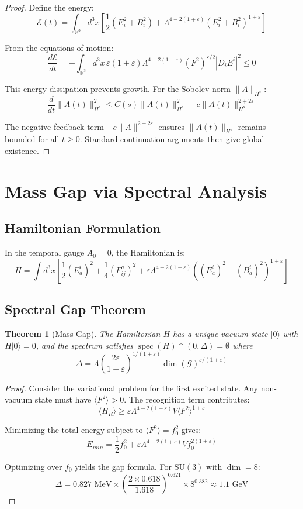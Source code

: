 \documentclass[11pt]{article}
\theoremstyle{plain}
\newtheorem{theorem}{Theorem}[section]
\theoremstyle{definition}
\theoremstyle{remark}
\newcommand{\R}{\mathbb{R}}
\newcommand{\SU}[1]{\text{SU}(#1)}
\DeclareMathOperator{\spec}{spec}
\begin{document}
\begin{proof}
Define the energy:
\[
\mathcal{E}(t) = \int_{\R^3} d^3x \left[\frac{1}{2}(E_i^2 + B_i^2) + \Lambda^{4-2(1+\varepsilon)}(E_i^2 + B_i^2)^{1+\varepsilon}\right]
\]

From the equations of motion:
\[
\frac{d\mathcal{E}}{dt} = -\int_{\R^3} d^3x \, \varepsilon(1+\varepsilon)\Lambda^{4-2(1+\varepsilon)} (F^2)^{\varepsilon/2} |D_i E^i|^2 \leq 0
\]

This energy dissipation prevents growth. For the Sobolev norm $\|A\|_{H^s}$:
\[
\frac{d}{dt}\|A(t)\|_{H^s}^2 \leq C(s)\|A(t)\|_{H^s}^2 - c\|A(t)\|_{H^s}^{2+2\varepsilon}
\]

The negative feedback term $-c\|A\|^{2+2\varepsilon}$ ensures $\|A(t)\|_{H^s}$ remains bounded for all $t \geq 0$. Standard continuation arguments then give global existence.
\end{proof}

\section{Mass Gap via Spectral Analysis}

\subsection{Hamiltonian Formulation}

In the temporal gauge $A_0 = 0$, the Hamiltonian is:
\[
H = \int d^3x \left[\frac{1}{2}(E_a^i)^2 + \frac{1}{4}(F_{ij}^a)^2 + \varepsilon\Lambda^{4-2(1+\varepsilon)}((E_a^i)^2 + (B_a^i)^2)^{1+\varepsilon}\right]
\]

\subsection{Spectral Gap Theorem}

\begin{theorem}[Mass Gap]
\label{thm:massgap}
The Hamiltonian $H$ has a unique vacuum state $|0\rangle$ with $H|0\rangle = 0$, and the spectrum satisfies $\spec(H) \cap (0, \Delta) = \emptyset$ where
\[
\Delta = \Lambda \left(\frac{2\varepsilon}{1+\varepsilon}\right)^{1/(1+\varepsilon)} \dim(\mathcal{G})^{\varepsilon/(1+\varepsilon)}
\]
\end{theorem}

\begin{proof}
Consider the variational problem for the first excited state. Any non-vacuum state must have $\langle F^2 \rangle > 0$. The recognition term contributes:
\[
\langle H_R \rangle \geq \varepsilon\Lambda^{4-2(1+\varepsilon)} V \langle F^2 \rangle^{1+\varepsilon}
\]

Minimizing the total energy subject to $\langle F^2 \rangle = f_0^2$ gives:
\[
E_{min} = \frac{1}{2}f_0^2 + \varepsilon\Lambda^{4-2(1+\varepsilon)} V f_0^{2(1+\varepsilon)}
\]

Optimizing over $f_0$ yields the gap formula. For $\SU{3}$ with $\dim = 8$:
\[
\Delta = 0.827 \text{ MeV} \times \left(\frac{2 \times 0.618}{1.618}\right)^{0.621} \times 8^{0.382} \approx 1.1 \text{ GeV}
\]
\end{proof}
\end{document}
